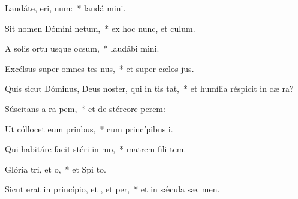 \item Laudáte, eri, num:~* laudá  mini.
\item Sit nomen Dómini netum,~* ex hoc nunc, et   culum.
\item A solis ortu usque  ocsum,~* laudábi  mini.
\item Excélsus super omnes tes nus,~* et super cælos  jus.
\item Quis sicut Dóminus, Deus noster, qui in tis tat,~* et humília réspicit in cæ   ra?
\item Súscitans a ra pem,~* et de stércore  perem:
\item Ut cóllocet eum  prinbus,~* cum princípibus  i.
\item Qui habitáre facit stéri in mo,~* matrem fili tem.
\item Glória tri, et o,~* et Spi to.
\item Sicut erat in princípio, et , et per,~* et in sǽcula sæ. men.
